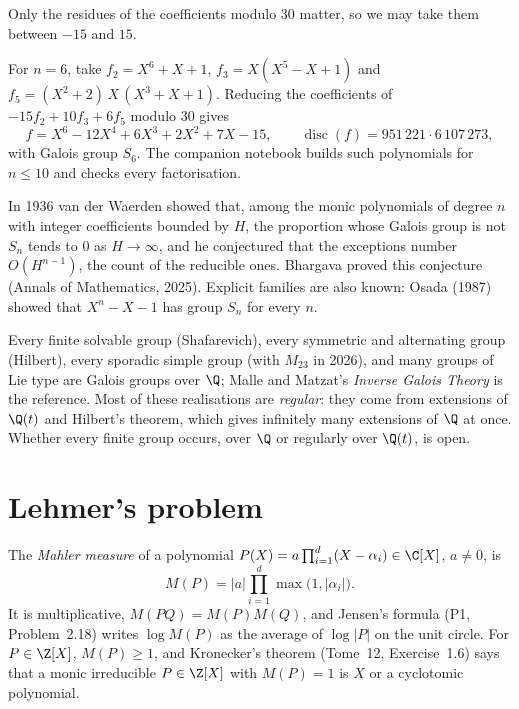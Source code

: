 Only the residues of the coefficients modulo $30$ matter, so we may take them between $-15$ and $15$.

\begin{example}\label{exa:sextic}
For $n=6$, take $f_2=X^6+X+1$, $f_3=X(X^5-X+1)$ and $f_5=(X^2+2)\,X\,(X^3+X+1)$. Reducing the coefficients of $-15f_2+10f_3+6f_5$ modulo $30$ gives
\[
f=X^6-12X^4+6X^3+2X^2+7X-15,\qquad \operatorname{disc}(f)=951\,221\cdot6\,107\,273,
\]
with Galois group $S_6$. The companion notebook builds such polynomials for $n\le10$ and checks every factorisation.
\end{example}

\begin{remark}\label{rem:vdw}
In 1936 van der Waerden showed that, among the monic polynomials of degree $n$ with integer coefficients bounded by $H$, the proportion whose Galois group is
not $S_n$ tends to $0$ as $H\to\infty$, and he conjectured that the exceptions number $O(H^{n-1})$, the count of the reducible ones. Bhargava proved this
conjecture (Annals of Mathematics, 2025). Explicit families are also known: Osada (1987) showed that $X^n-X-1$ has group $S_n$ for every $n$.
\end{remark}

\begin{remark}\label{rem:igpknown}
Every finite solvable group (Shafarevich), every symmetric and alternating group (Hilbert), every sporadic simple group (with $M_{23}$ in 2026), and many
groups of Lie type are Galois groups over $\Q$; Malle and Matzat's \emph{Inverse Galois Theory} is the reference. Most of these realisations are
\emph{regular}: they come from extensions of $\Q(t)$ and Hilbert's theorem, which gives infinitely many extensions of $\Q$ at once. Whether every finite
group occurs, over $\Q$ or regularly over $\Q(t)$, is open.
\end{remark}

\section{Lehmer's problem}

The \emph{Mahler measure} of a polynomial $P(X)=a\prod_{i=1}^d(X-\alpha_i)\in\C[X]$, $a\ne0$, is
\[
M(P)=|a|\prod_{i=1}^d\max\bigl(1,|\alpha_i|\bigr).
\]
It is multiplicative, $M(PQ)=M(P)M(Q)$, and Jensen's formula (P1, Problem~2.18) writes $\log M(P)$ as the average of $\log|P|$ on the unit circle. For
$P\in\Z[X]$, $M(P)\ge1$, and Kronecker's theorem (Tome~12, Exercise~1.6) says that a monic irreducible $P\in\Z[X]$ with $M(P)=1$ is $X$ or a
cyclotomic polynomial.

